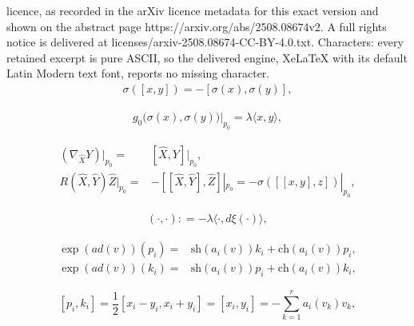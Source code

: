 \documentclass[10pt,a4paper]{amsart}
\begin{document}
licence, as recorded in the arXiv licence metadata for this exact version and shown on the abstract page https://arxiv.org/abs/2508.08674v2. A full rights notice is delivered at licenses/arxiv-2508.08674-CC-BY-4.0.txt. Characters: every retained excerpt is pure ASCII, so the delivered engine, XeLaTeX with its default Latin Modern text font, reports no missing character.
\begin{align}\label{relation between lie algebra and kill field}
    \sigma([x, y]) = -[\sigma(x), \sigma(y)], 
\end{align}

\begin{align}\label{metric = Killing form}
g_0\bigl(\sigma(x), \sigma(y)\bigr)\big|_{p_0} = \lambda \langle x, y\rangle,
\end{align}

\begin{equation}\label{sectional curvature}
    \begin{split}
        (\nabla_{\hat{X}} Y)|_{p_0} =& [\hat{X}, Y]|_{p_0},\\
        R(\hat{X}, \hat{Y}) \hat{Z}|_{p_0} =& -[[\hat{X}, \hat{Y}], \hat{Z}]|_{p_0} = -\sigma([[x, y], z])|_{p_0},
    \end{split}
\end{equation}

\begin{align}\label{inner product on lie algebra}
	(\cdot, \cdot): = -\lambda \langle \cdot, d\xi(\cdot) \rangle,
\end{align}

\begin{equation}\label{sinh existence}
    \begin{split}
        \exp(ad(v))(p_i) =& \mathrm{sh}(a_i(v))k_i + \mathrm{ch}(a_i(v)) p_i,\\
        \exp(ad(v))(k_i) =& \mathrm{sh}(a_i(v))p_i + \mathrm{ch}(a_i(v)) k_i,
    \end{split}
\end{equation}

\begin{equation}\label{basic frame relation 1}
    [p_i, k_i] = \frac{1}{2}[x_i - y_i, x_i + y_i] = [x_i,y_i] = -\sum_{k = 1}^{r}a_i(v_k)v_k,
\end{equation}
\end{document}
